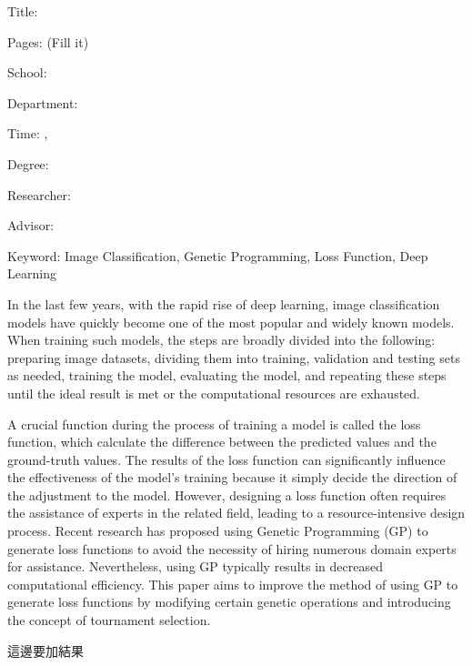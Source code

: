 \begin{EnAbstract}
    \begin{EnAbstractItems}
        \noindent \text Title: \eTitle

        \noindent \text Pages: (Fill it)

        \noindent \text School: \univEname

        \noindent \text Department: \deptEname

        \noindent \text Time: \eMonth, \eYear

        \noindent \text Degree: \degreeEname

        \noindent \text Researcher: \myEname

        \noindent \text Advisor: \advisorEname

        \noindent \text Keyword: Image Classification, Genetic Programming, Loss Function, Deep Learning

    \end{EnAbstractItems}

    \begin{EnAbstractDescription}
        In the last few years, with the rapid rise of deep learning, image classification models have quickly become one of the most popular and widely known models. When training such models, the steps are broadly divided into the following: preparing image datasets, dividing them into training, validation and testing sets as needed, training the model, evaluating the model, and repeating these steps until the ideal result is met or the computational resources are exhausted.

        A crucial function during the process of training a model is called the loss function, which calculate the difference between the predicted values and the ground-truth values. The results of the loss function can significantly influence the effectiveness of the model's training because it simply decide the direction of the adjustment to the model. However, designing a loss function often requires the assistance of experts in the related field, leading to a resource-intensive design process. Recent research has proposed using Genetic Programming (GP) to generate loss functions to avoid the necessity of hiring numerous domain experts for assistance. Nevertheless, using GP typically results in decreased computational efficiency. This paper aims to improve the method of using GP to generate loss functions by modifying certain genetic operations and introducing the concept of tournament selection.

        這邊要加結果
    \end{EnAbstractDescription}

\end{EnAbstract}

